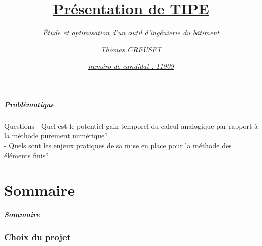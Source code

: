 \documentclass[10pt]{beamer}
\author{\textit{Thomas CREUSET}}
\title{\uline{Pr\'esentation de TIPE}}
\subtitle{\textit{\'Etude et optimisation d’un outil d'ing\'enierie du b\^atiment}}
\date{\underline{\textit{num\'ero de candidat : 11909}}}
\begin{document}
	\frame{\titlepage}

	\begin{frame}
		\frametitle{\uline{Probl\`ematique}}
		\begin{block}{Questions}
			- Quel est le potentiel gain temporel du calcul analogique par rapport à la méthode purement
numérique?\\
			- Quels sont les enjeux pratiques de sa mise en place pour la méthode des éléments
finis?
		\end{block}
	\end{frame}

	\part{Sommaire}
	\begin{frame}
		\frametitle{\uline{Sommaire}}
		\tableofcontents
	\end{frame}

	\section{Choix du projet}
\end{document}
